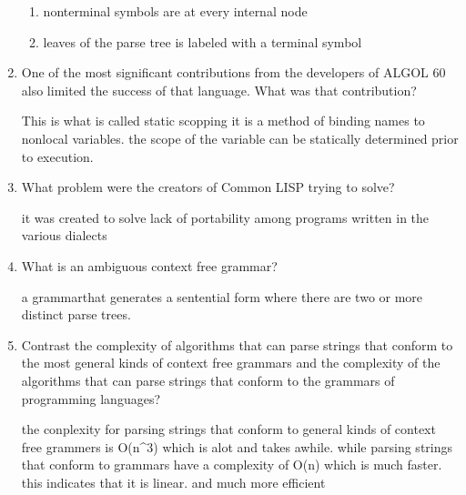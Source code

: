 \begin{enumerate}
  \begin{answer}

  \begin{enumerate}
    \item nonterminal symbols are at every internal node
    \item leaves of the parse tree is labeled with a terminal symbol
    \end{enumerate}

    \end{answer}


  \item One of the most significant contributions from the developers
    of ALGOL 60 also limited the success of that language. What was
    that contribution?

  \begin{answer}

   This is what is called static scopping it is a method of binding names to nonlocal 
   variables. the scope of the variable can be statically determined prior to execution.
    \end{answer}

  \item What problem were the creators of Common LISP trying to solve?

  \begin{answer}

  it was created to solve  lack of portability among programs written in the various
  dialects

    \end{answer}

  \item What is an ambiguous context free grammar?

  \begin{answer}
    a grammarthat  generates a sentential form where there are two or more distinct parse
 trees.
        \end{answer}

  \item Contrast the complexity of algorithms that can parse strings
    that conform to the most general kinds of context free grammars
    and the complexity of the algorithms that can parse strings that
    conform to the grammars of programming languages?

  \begin{answer}

    the conplexity for parsing strings that conform to general kinds of context free 
    grammers is O(n^3) which is alot and takes awhile. while parsing strings that
    conform to grammars have a complexity of O(n) which is much faster. this indicates
    that it is linear. and much more efficient


\end{answer}
\end{enumerate}
